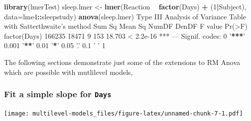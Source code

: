 \documentclass[]{article}
\newenvironment{Shaded}{\begin{snugshade}}{\end{snugshade}}
\newcommand{\DataTypeTok}[1]{\textcolor[rgb]{0.13,0.29,0.53}{#1}}
\newcommand{\DecValTok}[1]{\textcolor[rgb]{0.00,0.00,0.81}{#1}}
\newcommand{\ErrorTok}[1]{\textcolor[rgb]{0.64,0.00,0.00}{\textbf{#1}}}
\newcommand{\KeywordTok}[1]{\textcolor[rgb]{0.13,0.29,0.53}{\textbf{#1}}}
\newcommand{\NormalTok}[1]{#1}
\newcommand{\OperatorTok}[1]{\textcolor[rgb]{0.81,0.36,0.00}{\textbf{#1}}}
\newcommand{\StringTok}[1]{\textcolor[rgb]{0.31,0.60,0.02}{#1}}
\begin{document}
\begin{Shaded}
\begin{Highlighting}[]
\KeywordTok{library}\NormalTok{(lmerTest)}
\NormalTok{sleep.lmer <-}\StringTok{ }\KeywordTok{lmer}\NormalTok{(Reaction }\OperatorTok{~}\StringTok{ }\KeywordTok{factor}\NormalTok{(Days) }\OperatorTok{+}\StringTok{ }\NormalTok{(}\DecValTok{1}\OperatorTok{|}\NormalTok{Subject), }\DataTypeTok{data=}\NormalTok{lme4}\OperatorTok{::}\NormalTok{sleepstudy)}
\KeywordTok{anova}\NormalTok{(sleep.lmer)}
\NormalTok{Type III Analysis of Variance Table with Satterthwaite}\StringTok{'s method}
\StringTok{             Sum Sq Mean Sq NumDF DenDF F value    Pr(>F)    }
\StringTok{factor(Days) 166235   18471     9   153  18.703 < 2.2e-16 ***}
\StringTok{---}
\StringTok{Signif. codes:  0 '}\OperatorTok{**}\ErrorTok{*}\StringTok{' 0.001 '}\OperatorTok{**}\StringTok{' 0.01 '}\OperatorTok{*}\StringTok{' 0.05 '}\NormalTok{.}\StringTok{' 0.1 '} \StringTok{' 1}
\end{Highlighting}
\end{Shaded}

The following sections demonstrate just some of the extensions to RM Anova which
are possible with mutlilevel models,

\hypertarget{fit-a-simple-slope-for-days}{%
\subsubsection*{\texorpdfstring{Fit a simple slope for \texttt{Days}}{Fit a simple slope for Days}}\label{fit-a-simple-slope-for-days}}

\begin{Shaded}
\end{Shaded}

\texttt{[image: multilevel-models\_files/figure-latex/unnamed-chunk-7-1.pdf]}
\end{document}
